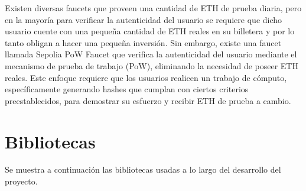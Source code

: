Existen diversas faucets que proveen una cantidad de ETH de prueba diaria, pero en la mayoría para verificar la autenticidad del usuario se requiere que dicho usuario cuente con una pequeña cantidad de ETH reales en su billetera y por lo tanto obligan a hacer una pequeña inversión.
Sin embargo, existe una faucet llamada Sepolia PoW Faucet que verifica la autenticidad del usuario mediante el mecanismo de prueba de trabajo (PoW), eliminando la necesidad de poseer ETH reales.
Este enfoque requiere que los usuarios realicen un trabajo de cómputo, específicamente generando hashes que cumplan con ciertos criterios preestablecidos, para demostrar su esfuerzo y recibir ETH de prueba a cambio. 


\section{Bibliotecas}

Se muestra a continuación las bibliotecas usadas a lo largo del desarrollo del proyecto.

